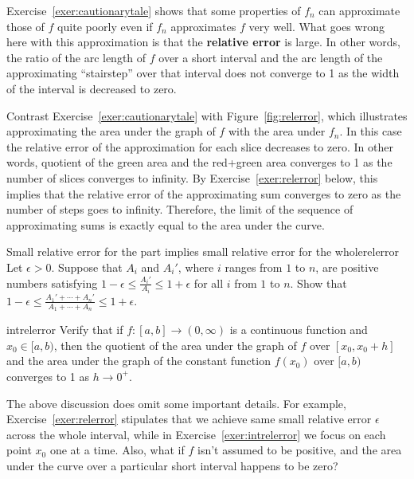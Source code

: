 \documentclass[svgnames]{watsonbook}
\begin{document}
Exercise~\ref{exer:cautionarytale} shows that some properties of $f_n$
can approximate those of $f$ quite poorly even if $f_n$ approximates
$f$ very well. What goes wrong here with this approximation is that
the \textbf{relative error} is large. In other words, the ratio of the
arc length of $f$ over a short interval and the arc length of the
approximating ``stairstep'' over that interval does not converge to 1
as the width of the interval is decreased to zero.

Contrast Exercise~\ref{exer:cautionarytale} with
Figure~\ref{fig:relerror}, which illustrates approximating the area
under the graph of $f$ with the area under $f_n$. In this case the
relative error of the approximation for each slice decreases to
zero. In other words, quotient of the green area and the red+green
area converges to 1 as the number of slices converges to infinity. By
Exercise~\ref{exer:relerror} below, this implies that the relative
error of the approximating sum converges to zero as the number of
steps goes to infinity. Therefore, the limit of the sequence of
approximating sums is exactly equal to the area under the curve.

\begin{exercise}{Small relative error for the part implies small
    relative error for the whole}{relerror}
  Let $\epsilon > 0$. Suppose that $A_i$ and $A_i'$, where $i$ ranges
  from $1$ to $n$, are positive numbers satisfying
  $1-\epsilon \leq \frac{A_{i}'}{A_{i}} \leq 1 + \epsilon$ for all $i$
  from $1$ to $n$. Show that
  $1-\epsilon \leq \frac{A_1'+\cdots+A_n'}{A_1+\cdots+A_n} \leq 1 +
  \epsilon$.  
\end{exercise}

\begin{exercise}{}{intrelerror}
  Verify that if $f:[a,b] \to (0,\infty)$ is a continuous function and
  $x_0 \in [a,b)$, then the quotient of the area under the graph of $f$ over
  $[x_0,x_0+h]$ and the area under the graph of the constant function
  $f(x_0)$ over $[a,b)$ converges to 1 as $h \to 0^+$. 
\end{exercise}

The above discussion does omit some important details. For example,
Exercise~\ref{exer:relerror} stipulates that we achieve same small
relative error $\epsilon$ across the whole interval, while in
Exercise~\ref{exer:intrelerror} we focus on each point $x_0$ one at a
time. Also, what if $f$ isn't assumed to be positive, and the area
under the curve over a particular short interval happens to be zero?
\end{document}
